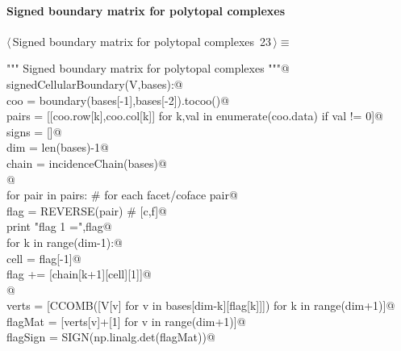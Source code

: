 \documentclass[11pt,oneside]{article}	%
\begin{document}

\paragraph{Signed boundary matrix for polytopal complexes}

\begin{flushleft} \small \label{scrap40}
\protect{}$\langle\,$Signed boundary matrix for polytopal complexes\nobreak\ {\footnotesize 23}$\,\rangle\equiv$
\vspace{-1ex}
\begin{list}{}{} \item
\mbox{}\verb@""" Signed boundary matrix for polytopal complexes """@\\
\mbox{}\verb@def signedCellularBoundary(V,bases):@\\
\mbox{}\verb@   coo = boundary(bases[-1],bases[-2]).tocoo()@\\
\mbox{}\verb@   pairs = [[coo.row[k],coo.col[k]] for k,val in enumerate(coo.data) if val != 0]@\\
\mbox{}\verb@   signs = []@\\
\mbox{}\verb@   dim = len(bases)-1@\\
\mbox{}\verb@   chain = incidenceChain(bases)@\\
\mbox{}\verb@   @\\
\mbox{}\verb@   for pair in pairs:      # for each facet/coface pair@\\
\mbox{}\verb@      flag = REVERSE(pair) #  [c,f]@\\
\mbox{}\verb@      print "flag 1 =",flag@\\
\mbox{}\verb@      for k in range(dim-1):@\\
\mbox{}\verb@         cell = flag[-1]@\\
\mbox{}\verb@         flag += [chain[k+1][cell][1]]@\\
\mbox{}\verb@      @\\
\mbox{}\verb@      verts = [CCOMB([V[v] for v in bases[dim-k][flag[k]]]) for k in range(dim+1)]@\\
\mbox{}\verb@      flagMat = [verts[v]+[1] for v in range(dim+1)]@\\
\mbox{}\verb@      flagSign = SIGN(np.linalg.det(flagMat))@\\

\end{list}
\end{flushleft}
\end{document}
